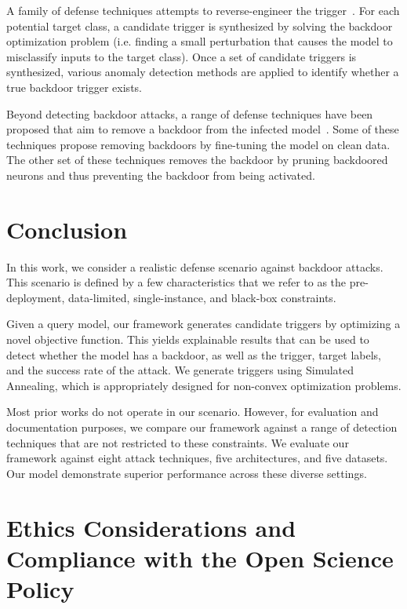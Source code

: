 \documentclass[letterpaper,twocolumn,10pt]{article}
\begin{document}
A family of defense techniques attempts to reverse-engineer the trigger~\cite{wang2019cleanse, tao2022pixel, shen2021karm, dong2021black, guo2021aeva, wang2020datafree}. For each potential target class, a candidate trigger is synthesized by solving the backdoor optimization problem (i.e. finding a small perturbation that causes the model to misclassify inputs to the target class). Once a set of candidate triggers is synthesized, various anomaly detection methods are applied to identify whether a true backdoor trigger exists.

Beyond detecting backdoor attacks, a range of defense techniques have been proposed that aim to remove a backdoor from the infected model~\cite{huang2024ubainf, liu2024mudjacking, liu2018finepruning, wu2021adversarial, zhao2020bridging}. Some of these techniques propose removing backdoors by fine-tuning the model on clean data. The other set of these techniques removes the backdoor by pruning backdoored neurons and thus preventing the backdoor from being activated.

\section{Conclusion}
\label{sec:conclusion}

In this work, we consider a realistic defense scenario against backdoor attacks. This scenario is defined by a few characteristics that we refer to as the pre-deployment, data-limited, single-instance, and black-box constraints.

Given a query model, our framework generates candidate triggers by optimizing a novel objective function. This yields explainable results that can be used to detect whether the model has a backdoor, as well as the trigger, target labels, and the success rate of the attack. We generate triggers using Simulated Annealing, which is appropriately designed for non-convex optimization problems.

Most prior works do not operate in our scenario. However, for evaluation and documentation purposes, we compare our framework against a range of detection techniques that are not restricted to these constraints. We evaluate our framework against eight attack techniques, five architectures, and five datasets. Our model demonstrate superior performance across these diverse settings.


\newpage

\section*{Ethics Considerations and Compliance with the Open Science Policy}
 
\end{document}
